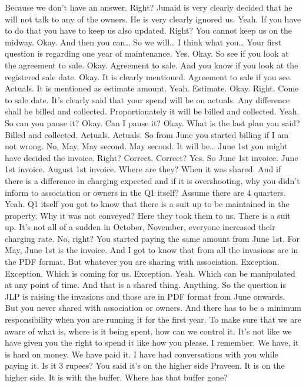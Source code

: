Because we don't have an answer. Right?
Junaid is very clearly decided that he will not talk to any of the owners.
He is very clearly ignored us. Yeah.
If you have to do that you have to keep us also updated. Right?
You cannot keep us on the midway. Okay.
And then you can… So we will… I think what you…
Your first question is regarding one year of maintenance. Yes.
Okay. So see if you look at the agreement to sale.
Okay. Agreement to sale. And you know if you look at the registered sale date.
Okay. It is clearly mentioned.
Agreement to sale if you see. Actuals.
It is mentioned as estimate amount. Yeah.
Estimate. Okay. Right.
Come to sale date. It's clearly said that your spend will be on actuals.
Any difference shall be billed and collected.
Proportionately it will be billed and collected. Yeah.
So can you pause it? Okay.
Can I pause it? Okay. What is the last plan you said?
Billed and collected. Actuals. Actuals.
So from June you started billing if I am not wrong. No, May.
May second. May second. It will be…
June 1st you might have decided the invoice. Right?
Correct. Correct? Yes.
So June 1st invoice.
June 1st invoice. August 1st invoice. Where are they? When it was shared.
And if there is a difference in charging expected and if it is overshooting,
why you didn't inform to association or owners in the Q1 itself?
Assume there are 4 quarters. Yeah.
Q1 itself you got to know that there is a suit up to be maintained in the property.
Why it was not conveyed? Here they took them to us.
There is a suit up. It's not all of a sudden in October, November,
everyone increased their charging rate. No, right?
You started paying the same amount from June 1st.
For May, June 1st is the invoice.
And I got to know that from all the invasions are in the PDF format.
But whatever you are sharing with association.
Exception. Exception.
Which is coming for us. Exception. Yeah.
Which can be manipulated at any point of time.
And that is a shared thing.
Anything. So the question is JLP is raising the invasions
and those are in PDF format from June onwards.
But you never shared with association or owners.
And there has to be a minimum responsibility when you are running it for the first year.
To make sure that we are aware of what is, where is it being spent, how can we control it.
It's not like we have given you the right to spend it like how you please.
I remember. We have, it is hard on money. We have paid it.
I have had conversations with you while paying it.
Is it 3 rupees? You said it's on the higher side Praveen.
It is on the higher side. It is with the buffer. Where has that buffer gone?
